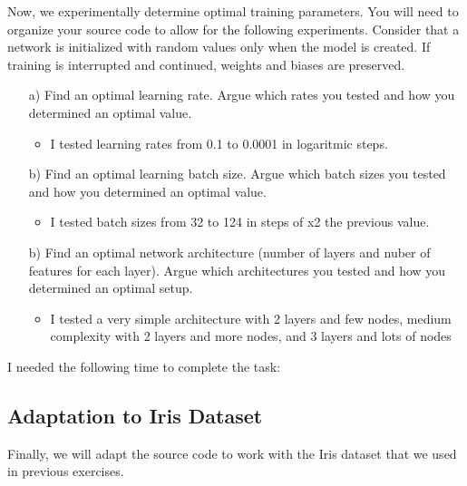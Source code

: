 \documentclass{article}
\begin{document}
Now, we experimentally determine optimal training parameters. You will need to organize your source code to allow for the following experiments. Consider that a network is initialized with random values only when the model is created. If training is interrupted and continued, weights and biases are preserved.

\begin{enumerate}

\item[a)] Find an optimal learning rate. Argue which rates you tested and how you determined an optimal value.
\begin{itemize}
    \item I tested learning rates from 0.1 to 0.0001 in logaritmic steps.
\end{itemize}
\item[b)] Find an optimal learning batch size. Argue which batch sizes you tested and how you determined an optimal value.
\begin{itemize}
    \item I tested batch sizes from 32 to 124 in steps of x2 the previous value.
\end{itemize}
\item[b)] Find an optimal network architecture (number of layers and nuber of features for each layer). Argue which architectures you tested and how you determined an optimal setup.
\begin{itemize}
    \item I tested a very simple architecture with 2 layers and few nodes, medium complexity with 2 layers and more nodes, and 3 layers and lots of nodes
\end{itemize}
\end{enumerate}

I needed the following time to complete the task:

\subsection{Adaptation to Iris Dataset}

Finally, we will adapt the source code to work with the Iris dataset that we used in previous exercises. 
\end{document}
